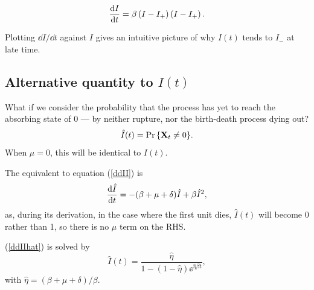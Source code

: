 \begin{equation}
\label{ddIIfact}
\displaystyle\frac{{\rm d} I}{{\rm d} t} =\beta\left( I-I_+\right)\left( I-I_+\right).
\end{equation}



\noindent
Plotting $\dd I/\dd t$ against $I$ gives an intuitive picture of why $I(t)$ tends to $I_-$ at late time. 


\subsection{Alternative quantity to $I(t)$}
What if we consider the probability that the process has yet to reach the absorbing state of 0 --- by neither rupture, nor the birth-death process dying out? 
$$\hat I(t) = {\text{Pr}\left\{{{\bf X}_t} \neq 0\right\}}.$$
When $\mu = 0$, this will be identical to $I(t)$.

The equivalent to equation (\ref{ddII}) is
\begin{equation}
\label{ddIIhat}
\displaystyle\frac{{\rm d} \hat I}{{\rm d} t} =  -(\beta + \mu + \delta)\hat I + \beta {\hat I}^2,
\end{equation}
as, during its derivation, in the case where the first unit dies, $\hat I(t)$ will become 0 rather than 1, so there is no $\mu$ term on the RHS.

(\ref{ddIIhat}) is solved by
$$\hat I(t) = \frac{\hat\eta}{1 - (1-\hat\eta)\ee^{\hat\eta\beta t}}, $$
with $\hat\eta = (\beta + \mu + \delta)/\beta$.
